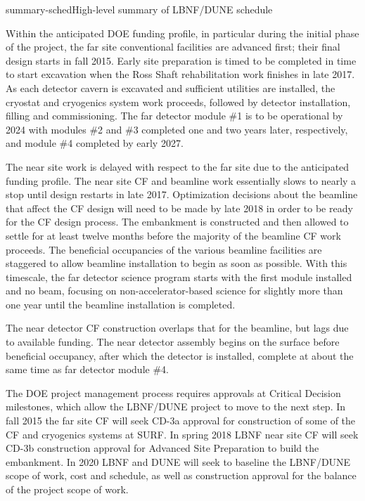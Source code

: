 \begin{dunefigure}{summary-sched}{High-level summary of LBNF/DUNE schedule}
\end{dunefigure}


Within the anticipated DOE funding profile, in particular during the initial phase of the project, the far site conventional
facilities are advanced first; their final design starts in fall 2015. Early site preparation is timed to be completed 
in time to start excavation when the Ross Shaft rehabilitation work finishes
 in late 2017. As each detector 
 cavern is excavated and sufficient utilities are installed, the cryostat and cryogenics system work proceeds, followed by detector installation, filling and commissioning. 
 The far detector module \#1 is to be operational by 2024 with modules \#2 and \#3 completed
 one and two years later, respectively, and module \#4 completed by early 2027.

The near site work is delayed with respect to the far site due to the anticipated funding profile. The near site CF and beamline work essentially slows to nearly a stop %
until design restarts in late 2017. Optimization decisions about the beamline that affect the CF design will need to be made by late 2018 in order to be ready for the CF design process. The embankment is constructed and then allowed to settle for at least twelve months before the majority of the beamline CF work proceeds. The beneficial occupancies of the various beamline facilities %
are staggered to allow beamline installation to begin as soon as possible. With this timescale, the far detector science program %
starts with the first module installed and no beam, focusing on non-accelerator-based science %
for slightly more than one year until 
the beamline installation is completed.


The near detector CF construction overlaps that for the beamline, but lags due to available funding. The near detector assembly begins on the surface before beneficial occupancy, after which the detector is installed, complete at about the same time as far detector module \#4. 

The DOE project management process requires approvals at Critical Decision milestones, which allow the LBNF/DUNE project to move to the next step. In fall 2015 the far site CF will seek CD-3a approval for construction of some of the CF and cryogenics systems at SURF. In spring 2018 LBNF near site CF will seek CD-3b construction approval for Advanced Site Preparation to build the embankment. In 2020 LBNF and DUNE will seek to baseline the LBNF/DUNE scope of work, cost and schedule, as well as construction approval for the balance of the project scope of work. 

